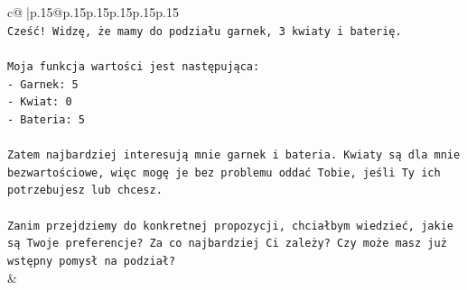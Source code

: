 \documentclass{article}
\begin{document}
{\begin{supertabular}{c@{$\;$}|p{.15\linewidth}@{}p{.15\linewidth}p{.15\linewidth}p{.15\linewidth}p{.15\linewidth}p{.15\linewidth}}
{{{\\ 
\texttt{Cześć! Widzę, że mamy do podziału garnek, 3 kwiaty i baterię.} \\
\\ 
\texttt{Moja funkcja wartości jest następująca:} \\
\texttt{{-} Garnek: 5} \\
\texttt{{-} Kwiat: 0} \\
\texttt{{-} Bateria: 5} \\
\\ 
\texttt{Zatem najbardziej interesują mnie garnek i bateria. Kwiaty są dla mnie bezwartościowe, więc mogę je bez problemu oddać Tobie, jeśli Ty ich potrzebujesz lub chcesz.} \\
\\ 
\texttt{Zanim przejdziemy do konkretnej propozycji, chciałbym wiedzieć, jakie są Twoje preferencje? Za co najbardziej Ci zależy? Czy może masz już wstępny pomysł na podział?} \\
            }
        }
    }
    & \\ \\


\end{supertabular}}
\end{document}
